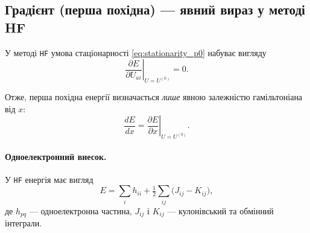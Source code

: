 \documentclass{PySCFBook}
\begin{document}
%
%
%

\subsection{Градієнт (перша похідна) — явний вираз у методі HF}

У методі \texttt{HF} умова стаціонарності \eqref{eq:stationarity_p0} набуває вигляду
\[
\left.\frac{\partial E}{\partial U_{ai}}\right|_{U=U^{(0)}} = 0.
\]

Отже, перша похідна енергії визначається \emph{лише} явною залежністю
гамільтоніана від $x$:
\begin{equation}\label{eq:HF_gradient_basic}
\frac{dE}{dx}
=
\left.\frac{\partial E}{\partial x}\right|_{U=U^{(0)}} .
\end{equation}

\paragraph{Одноелектронний внесок.}
У \texttt{HF} енергія має вигляд
\[
E = \sum_i h_{ii} + \tfrac{1}{2}\sum_{ij}\big( J_{ij} - K_{ij} \big),
\]
де $h_{pq}$ --- одноелектронна частина, $J_{ij}$ і $K_{ij}$ --- кулонівський
та обмінний інтеграли.
\end{document}
